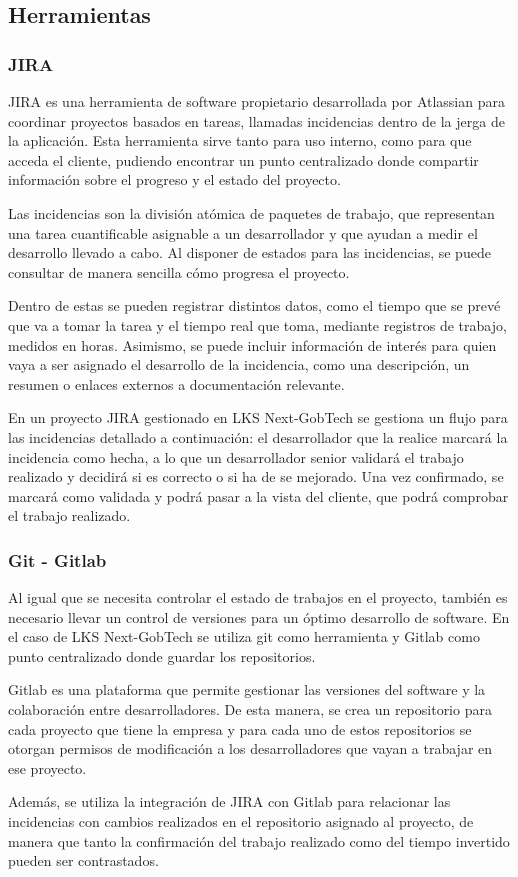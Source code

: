 \subsection{Herramientas}
\subsubsection{JIRA}
JIRA es una herramienta de software propietario desarrollada por Atlassian para coordinar proyectos basados en tareas, llamadas incidencias dentro de la jerga de la aplicación. Esta herramienta sirve tanto para uso interno, como para que acceda el cliente, pudiendo encontrar un punto centralizado donde compartir información sobre el progreso y el estado del proyecto.

Las incidencias son la división atómica de paquetes de trabajo, que representan una tarea cuantificable asignable a un desarrollador y que ayudan a medir el desarrollo llevado a cabo. Al disponer de estados para las incidencias, se puede consultar de manera sencilla cómo progresa el proyecto. 

Dentro de estas se pueden registrar distintos datos, como el tiempo que se prevé que va a tomar la tarea y el tiempo real que toma, mediante registros de trabajo, medidos en horas. Asimismo, se puede incluir información de interés para quien vaya a ser asignado el desarrollo de la incidencia, como una descripción, un resumen o enlaces externos a documentación relevante.

En un proyecto JIRA gestionado en LKS Next-GobTech se gestiona un flujo para las incidencias detallado a continuación: el desarrollador que la realice marcará la incidencia como hecha, a lo que un desarrollador senior validará el trabajo realizado y decidirá si es correcto o si ha de se mejorado. Una vez confirmado, se marcará como validada y podrá pasar a la vista del cliente, que podrá comprobar el trabajo realizado.

\subsubsection{Git - Gitlab}
Al igual que se necesita controlar el estado de trabajos en el proyecto, también es necesario llevar un control de versiones para un óptimo desarrollo de software. En el caso de LKS Next-GobTech se utiliza git \cite{chacon2014pro} como herramienta y Gitlab como punto centralizado donde guardar los repositorios. 

Gitlab es una plataforma que permite gestionar las versiones del software y la colaboración entre desarrolladores. De esta manera, se crea un repositorio para cada proyecto que tiene la empresa y para cada uno de estos repositorios se otorgan permisos de modificación a los desarrolladores que vayan a trabajar en ese proyecto.

Además, se utiliza la integración de JIRA con Gitlab para relacionar las incidencias con cambios realizados en el repositorio asignado al proyecto, de manera que tanto la confirmación del trabajo realizado como del tiempo invertido pueden ser contrastados.